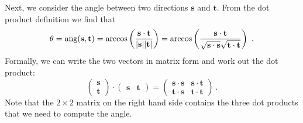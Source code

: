 Next, we consider the angle between two directions $\mathbf{s}$ and $\mathbf{t}$.  From the dot product definition we find that
\begin{equation}
	\theta = \text{ang}(\mathbf{s},\mathbf{t}) = \arccos\left( \frac{\mathbf{s}\cdot\mathbf{t}}{\vert\mathbf{s}\vert\vert\mathbf{t}\vert}\right) = 
	\arccos\left( \frac{\mathbf{s}\cdot\mathbf{t}}{\sqrt{\mathbf{s}\cdot\mathbf{s}}\sqrt{\mathbf{t}\cdot\mathbf{t}}}\right) \ .\OClabel{eq:defangle}
\end{equation}
Formally, we can write the two vectors in matrix form and work out the dot product:
\[
	\left(\begin{array}{c}\mathbf{s}\\ \mathbf{t}\end{array}\right)\cdot\left(\begin{array}{cc}\mathbf{s}&\mathbf{t}\end{array}\right)
	 = \left(\begin{array}{cc}\mathbf{s}\cdot\mathbf{s}&\mathbf{s}\cdot\mathbf{t}\\
	\mathbf{t}\cdot\mathbf{s}&\mathbf{t}\cdot\mathbf{t}\end{array}\right) \ .
\]
Note that the $2\times 2$ matrix on the right hand side contains the three dot products that we need to compute the angle.  

